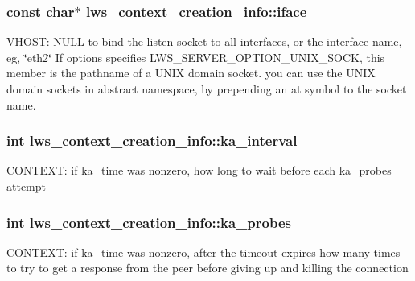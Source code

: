 \subsubsection[{\texorpdfstring{iface}{iface}}]{\setlength{\rightskip}{0pt plus 5cm}const char$\ast$ lws\+\_\+context\+\_\+creation\+\_\+info\+::iface}\hypertarget{structlws__context__creation__info_a75434932bb5df54665ea678eb8ac104a}{}\label{structlws__context__creation__info_a75434932bb5df54665ea678eb8ac104a}
V\+H\+O\+ST\+: N\+U\+LL to bind the listen socket to all interfaces, or the interface name, eg, \char`\"{}eth2\char`\"{} If options specifies L\+W\+S\+\_\+\+S\+E\+R\+V\+E\+R\+\_\+\+O\+P\+T\+I\+O\+N\+\_\+\+U\+N\+I\+X\+\_\+\+S\+O\+CK, this member is the pathname of a U\+N\+IX domain socket. you can use the U\+N\+IX domain sockets in abstract namespace, by prepending an at symbol to the socket name. 
\subsubsection[{\texorpdfstring{ka\+\_\+interval}{ka\_interval}}]{\setlength{\rightskip}{0pt plus 5cm}int lws\+\_\+context\+\_\+creation\+\_\+info\+::ka\+\_\+interval}\hypertarget{structlws__context__creation__info_a381342a398883d6204955ff3c1849ddd}{}\label{structlws__context__creation__info_a381342a398883d6204955ff3c1849ddd}
C\+O\+N\+T\+E\+XT\+: if ka\+\_\+time was nonzero, how long to wait before each ka\+\_\+probes attempt 
\subsubsection[{\texorpdfstring{ka\+\_\+probes}{ka\_probes}}]{\setlength{\rightskip}{0pt plus 5cm}int lws\+\_\+context\+\_\+creation\+\_\+info\+::ka\+\_\+probes}\hypertarget{structlws__context__creation__info_a3baab4285c679fbe027c2504621d7410}{}\label{structlws__context__creation__info_a3baab4285c679fbe027c2504621d7410}
C\+O\+N\+T\+E\+XT\+: if ka\+\_\+time was nonzero, after the timeout expires how many times to try to get a response from the peer before giving up and killing the connection 
